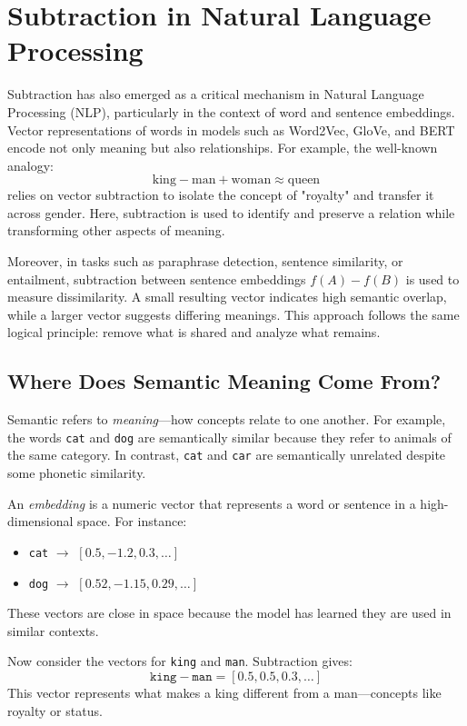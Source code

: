 \section{Subtraction in Natural Language Processing}
Subtraction has also emerged as a critical mechanism in Natural Language Processing (NLP), particularly in the context of word and sentence embeddings. Vector representations of words in models such as Word2Vec, GloVe, and BERT encode not only meaning but also relationships. For example, the well-known analogy:
\[
\text{king} - \text{man} + \text{woman} \approx \text{queen}
\]
relies on vector subtraction to isolate the concept of "royalty" and transfer it across gender. Here, subtraction is used to identify and preserve a relation while transforming other aspects of meaning.

Moreover, in tasks such as paraphrase detection, sentence similarity, or entailment, subtraction between sentence embeddings $f(A) - f(B)$ is used to measure dissimilarity. A small resulting vector indicates high semantic overlap, while a larger vector suggests differing meanings. This approach follows the same logical principle: remove what is shared and analyze what remains.

\subsection*{Where Does Semantic Meaning Come From?}
Semantic refers to \emph{meaning}—how concepts relate to one another. For example, the words \texttt{cat} and \texttt{dog} are semantically similar because they refer to animals of the same category. In contrast, \texttt{cat} and \texttt{car} are semantically unrelated despite some phonetic similarity.

An \emph{embedding} is a numeric vector that represents a word or sentence in a high-dimensional space. For instance:
\begin{itemize}
	\item \texttt{cat} $\rightarrow$ $[0.5, -1.2, 0.3, \dots]$
	\item \texttt{dog} $\rightarrow$ $[0.52, -1.15, 0.29, \dots]$
\end{itemize}
These vectors are close in space because the model has learned they are used in similar contexts.

Now consider the vectors for \texttt{king} and \texttt{man}. Subtraction gives:
\[
\texttt{king} - \texttt{man} = [0.5, 0.5, 0.3, \dots]
\]
This vector represents what makes a king different from a man—concepts like royalty or status.


